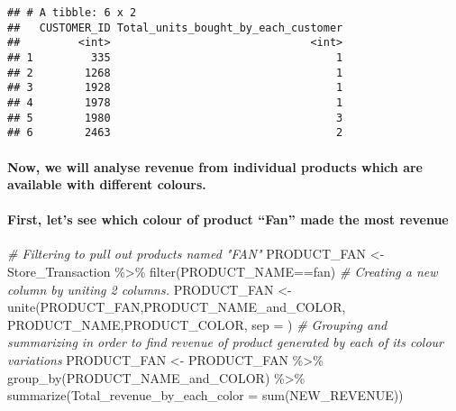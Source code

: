 \documentclass[
]{article}
\newenvironment{Shaded}{\begin{snugshade}}{\end{snugshade}}
\newcommand{\AttributeTok}[1]{\textcolor[rgb]{0.77,0.63,0.00}{#1}}
\newcommand{\CommentTok}[1]{\textcolor[rgb]{0.56,0.35,0.01}{\textit{#1}}}
\newcommand{\FunctionTok}[1]{\textcolor[rgb]{0.00,0.00,0.00}{#1}}
\newcommand{\NormalTok}[1]{#1}
\newcommand{\OtherTok}[1]{\textcolor[rgb]{0.56,0.35,0.01}{#1}}
\newcommand{\SpecialCharTok}[1]{\textcolor[rgb]{0.00,0.00,0.00}{#1}}
\newcommand{\StringTok}[1]{\textcolor[rgb]{0.31,0.60,0.02}{#1}}
\begin{document}
\begin{verbatim}
## # A tibble: 6 x 2
##   CUSTOMER_ID Total_units_bought_by_each_customer
##         <int>                               <int>
## 1         335                                   1
## 2        1268                                   1
## 3        1928                                   1
## 4        1978                                   1
## 5        1980                                   3
## 6        2463                                   2
\end{verbatim}

\hypertarget{now-we-will-analyse-revenue-from-individual-products-which-are-available-with-different-colours.}{%
\paragraph{Now, we will analyse revenue from individual products which
are available with different
colours.}\label{now-we-will-analyse-revenue-from-individual-products-which-are-available-with-different-colours.}}

\hypertarget{first-lets-see-which-colour-of-product-fan-made-the-most-revenue}{%
\paragraph{First, let's see which colour of product ``Fan'' made the
most
revenue}\label{first-lets-see-which-colour-of-product-fan-made-the-most-revenue}}

\begin{Shaded}
\begin{Highlighting}[]
\CommentTok{\# Filtering to pull out products named "FAN"}
\NormalTok{PRODUCT\_FAN }\OtherTok{\textless{}{-}}\NormalTok{ Store\_Transaction }\SpecialCharTok{\%\textgreater{}\%} \FunctionTok{filter}\NormalTok{(PRODUCT\_NAME}\SpecialCharTok{==}\StringTok{\textquotesingle{}fan\textquotesingle{}}\NormalTok{)}
\CommentTok{\# Creating a new column by uniting 2 columns.}
\NormalTok{PRODUCT\_FAN }\OtherTok{\textless{}{-}} \FunctionTok{unite}\NormalTok{(PRODUCT\_FAN,}\StringTok{\textquotesingle{}PRODUCT\_NAME\_and\_COLOR\textquotesingle{}}\NormalTok{, PRODUCT\_NAME,PRODUCT\_COLOR, }\AttributeTok{sep =} \StringTok{\textquotesingle{} \textquotesingle{}}\NormalTok{)}
\CommentTok{\# Grouping and summarizing in order to find revenue of product generated by each of its colour variations}
\NormalTok{PRODUCT\_FAN }\OtherTok{\textless{}{-}}\NormalTok{ PRODUCT\_FAN }\SpecialCharTok{\%\textgreater{}\%} \FunctionTok{group\_by}\NormalTok{(PRODUCT\_NAME\_and\_COLOR) }\SpecialCharTok{\%\textgreater{}\%}
  \FunctionTok{summarize}\NormalTok{(}\AttributeTok{Total\_revenue\_by\_each\_color =} \FunctionTok{sum}\NormalTok{(NEW\_REVENUE))}
\end{Highlighting}
\end{Shaded}
\end{document}
